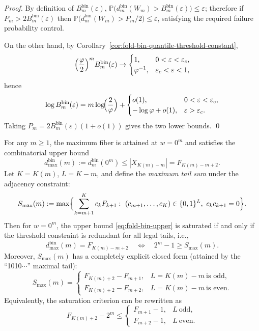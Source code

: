 \begin{proof}
By definition of \(B^{\mathrm{bin}}_m(\varepsilon)\),
\(
\mathbb{P}\bigl(d^{\mathrm{bin}}_m(W_m)>B^{\mathrm{bin}}_m(\varepsilon)\bigr)\le \varepsilon
\);
therefore if \(P_m>2B^{\mathrm{bin}}_m(\varepsilon)\) then
\(
\mathbb{P}\bigl(d^{\mathrm{bin}}_m(W_m)>P_m/2\bigr)\le\varepsilon
\), satisfying the required failure probability control.
\par
On the other hand, by Corollary~\ref{cor:fold-bin-quantile-threshold-constant},
\[
\Bigl(\frac{\varphi}{2}\Bigr)^m B^{\mathrm{bin}}_m(\varepsilon)\to
\begin{cases}
1,& 0<\varepsilon<\varepsilon_c,\\
\varphi^{-1},& \varepsilon_c<\varepsilon<1,
\end{cases}
\]
hence
\[
\log B^{\mathrm{bin}}_m(\varepsilon)
=m\log\!\Bigl(\frac{2}{\varphi}\Bigr)+
\begin{cases}
o(1),& 0<\varepsilon<\varepsilon_c,\\
-\log\varphi+o(1),& \varepsilon>\varepsilon_c.
\end{cases}
\]
Taking \(P_m=2B^{\mathrm{bin}}_m(\varepsilon)(1+o(1))\) gives the two lower bounds. \qed
\end{proof}

\begin{corollary}\label{cor:fold-bin-saturation}
For any \(m\ge 1\), the maximum fiber is attained at \(w=0^m\) and satisfies the combinatorial upper bound
\begin{equation}\label{eq:fold-bin-upper}
d^{\mathrm{bin}}_{\max}(m):=d^{\mathrm{bin}}_m(0^m)\le |X_{K(m)-m}|=F_{K(m)-m+2}.
\end{equation}
Let \(K=K(m)\), \(L=K-m\), and define the \emph{maximum tail sum} under the adjacency constraint:
\[
S_{\max}(m):=\max\Bigl\{\sum_{k=m+1}^{K} c_k F_{k+1}:\ (c_{m+1},\dots,c_K)\in\{0,1\}^{L},\ c_k c_{k+1}=0\Bigr\}.
\]
Then for \(w=0^m\), the upper bound \eqref{eq:fold-bin-upper} is saturated if and only if the threshold constraint is redundant for all legal tails, i.e.,
\begin{equation}\label{eq:fold-bin-sat-iff}
d^{\mathrm{bin}}_{\max}(m)=F_{K(m)-m+2}\quad\Longleftrightarrow\quad 2^m-1\ge S_{\max}(m).
\end{equation}
Moreover, \(S_{\max}(m)\) has a completely explicit closed form (attained by the ``1010\(\cdots\)'' maximal tail):
\begin{equation}\label{eq:fold-bin-Smax-closed}
S_{\max}(m)=
\begin{cases}
F_{K(m)+2}-F_{m+1}, & L=K(m)-m\ \text{is odd},\\
F_{K(m)+2}-F_{m+2}, & L=K(m)-m\ \text{is even}.
\end{cases}
\end{equation}
Equivalently, the saturation criterion can be rewritten as
\[
F_{K(m)+2}-2^m\le
\begin{cases}
F_{m+1}-1,& L\ \text{odd},\\
F_{m+2}-1,& L\ \text{even}.
\end{cases}
\]
\end{corollary}


